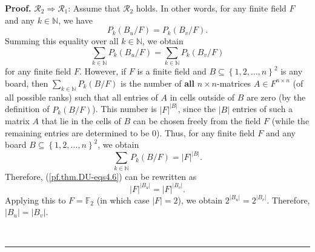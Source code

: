 \documentclass[numbers=enddot,12pt,final,onecolumn,notitlepage]{scrartcl}%
\theoremstyle{definition}
\newenvironment{proof}[1][Proof]{\noindent\textbf{#1.} }{\ \rule{0.5em}{0.5em}}
\newcommand{\NN}{\mathbb{N}}
\newenvironment{verlong}{}{}
\begin{document}
\begin{verlong}
\begin{proof}
$\mathcal{R}_2\Longrightarrow\mathcal{R}_1$: Assume that $\mathcal{R}_2$ holds.
In other words, for any finite field $F$ and any $k\in\NN$, we have
\begin{equation}
P_{k}\left(  B_{u}/F\right)  =P_{k}\left(  B_{v}/F\right)
.\label{pf.thm.DU-eqs4.5}%
\end{equation}
Summing this equality over all $k\in\NN$, we obtain%
\begin{equation}
\sum_{k\in\NN} P_{k}\left(  B_{u}/F\right)
=
\sum_{k\in\NN} P_{k}\left(  B_{v}/F\right)
\label{pf.thm.DU-eqs4.6}
\end{equation}
for any finite field $F$. However, if $F$ is a finite field and $B\subseteq
\left\{  1,2,\ldots,n\right\}  ^{2}$ is any board, then
$\sum\limits_{k\in\NN}P_{k}\left(  B/F\right)  $ is
the number of \textbf{all} $n\times
n$-matrices $A\in F^{n\times n}$ (of all possible ranks) such that all entries
of $A$ in cells outside of $B$ are zero (by the definition of $P_{k}\left(
B/F\right)  $). This number is $\left\vert F\right\vert ^{\left\vert
B\right\vert }$, since the $\left\vert B\right\vert $ entries of such a matrix
$A$ that lie in the cells of $B$ can be chosen freely from the field $F$
(while the remaining entries are determined to be $0$). Thus, for any finite
field $F$ and any board $B\subseteq\left\{  1,2,\ldots,n\right\}  ^{2}$, we
obtain%
\[
\sum_{k\in\NN}P_{k}\left(  B/F\right)
=\left\vert F\right\vert ^{\left\vert B\right\vert }.
\]
Therefore, (\ref{pf.thm.DU-eqs4.6}) can be rewritten as%
\[
\left\vert F\right\vert ^{\left\vert B_{u}\right\vert }=\left\vert
F\right\vert ^{\left\vert B_{v}\right\vert }.
\]
Applying this to $F=\mathbb{F}_{2}$ (in which case $\left\vert F\right\vert
=2$), we obtain $2^{\left\vert B_{u}\right\vert }=2^{\left\vert B_{v}%
\right\vert }$. Therefore, $\left\vert B_{u}\right\vert =\left\vert
B_{v}\right\vert $.


\end{proof}
\end{verlong}
\end{document}
